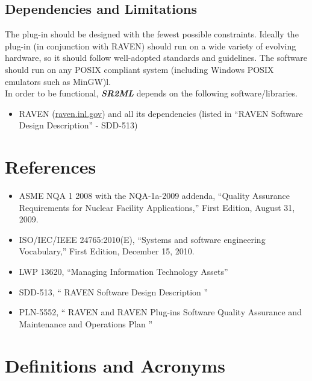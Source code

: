 \subsection{Dependencies and Limitations}
The plug-in should be designed with the fewest possible constraints.
Ideally the  plug-in (in conjunction with RAVEN)
 should run on a wide variety of evolving hardware,
so it should follow well-adopted standards and guidelines. The software
 should run on any POSIX compliant system (including Windows POSIX
 emulators such as MinGW)l.
\\In order to be functional, \textit{\textbf{SR2ML}} depends on the following software/libraries.
\begin{itemize}
  \item RAVEN (\url{raven.inl.gov}) and all its dependencies (listed in ``RAVEN Software Design Description'' - SDD-513)
\end{itemize}


\section{References}

\begin{itemize}

  \item ASME NQA 1 2008 with the NQA-1a-2009 addenda, ``Quality Assurance Requirements for Nuclear Facility Applications,'' First Edition, August 31, 2009.
  \item ISO/IEC/IEEE 24765:2010(E), ``Systems and software engineering Vocabulary,'' First Edition, December 15, 2010.
  \item LWP 13620, ``Managing Information Technology Assets''
  \item SDD-513, `` RAVEN Software Design Description ''
  \item PLN-5552, `` RAVEN and RAVEN Plug-ins Software Quality Assurance and Maintenance and Operations Plan ''
\end{itemize}


\section{Definitions and Acronyms}

